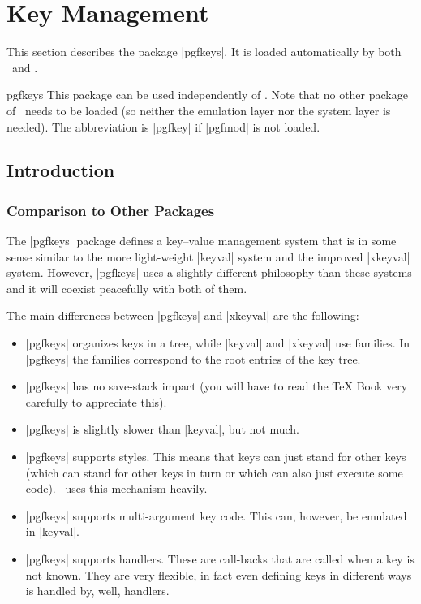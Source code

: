 %
%
%


\section{Key Management}
\label{section-keys}

This section describes the package |pgfkeys|. It is loaded automatically by
both \pgfname\ and \tikzname.

\begin{package}{pgfkeys}
    This package can be used independently of \pgfname. Note that no
    other package of \pgfname\ needs to be loaded (so neither the
    emulation layer nor the system layer is needed). The 
    abbreviation is |pgfkey|  if |pgfmod| is not loaded.
\end{package}


\subsection{Introduction}

\subsubsection{Comparison to Other Packages}

The |pgfkeys| package defines a key--value management system that is in some
sense similar to the more light-weight |keyval| system and the improved
|xkeyval| system. However, |pgfkeys| uses a slightly different philosophy than
these systems and it will coexist peacefully with both of them.

The main differences between |pgfkeys| and |xkeyval| are the following:
%
\begin{itemize}
    \item |pgfkeys| organizes keys in a tree, while |keyval| and |xkeyval|
        use families. In |pgfkeys| the families correspond to the root
        entries of the key tree.
    \item |pgfkeys| has no save-stack impact (you will have to read the \TeX
        Book very carefully to appreciate this).
    \item |pgfkeys| is slightly slower than |keyval|, but not much.
    \item |pgfkeys| supports styles. This means that keys can just stand for
        other keys (which can stand for other keys in turn or which can also
        just execute some code). \tikzname\ uses this mechanism heavily.
    \item |pgfkeys| supports multi-argument key code. This can, however, be
        emulated in |keyval|.
    \item |pgfkeys| supports handlers. These are call-backs that are called
        when a key is not known. They are very flexible, in fact even
        defining keys in different ways is handled by, well, handlers.
\end{itemize}


